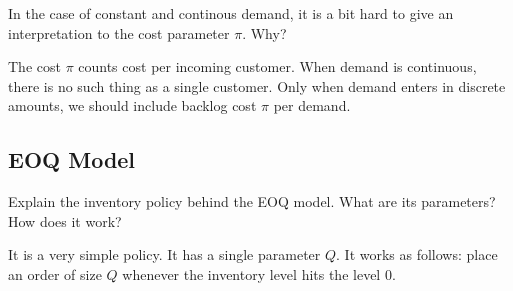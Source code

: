 \begin{exercise}
In the case of constant and continous demand, it is a bit hard to give an interpretation to the cost parameter $\pi$. Why?
  \begin{solution}
The cost $\pi$ counts cost per incoming customer. When demand is continuous, there is no such thing as a single customer.  Only when     demand enters in discrete amounts, we should include backlog cost $\pi$ per demand. 
  \end{solution}
\end{exercise}


\subsection{EOQ Model}

\begin{exercise}
Explain the inventory policy behind the EOQ model. What are its parameters? How does it work?


  \begin{solution}
It is a very simple policy. It has a single parameter $Q$. It works as follows: place an order of size $Q$ whenever the inventory level hits the level 0.
  \end{solution}
\end{exercise}
  

